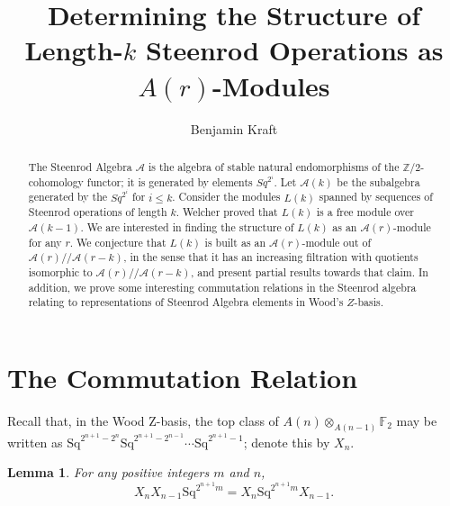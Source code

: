 \documentclass{article}
\title{Determining the Structure of Length-$k$ Steenrod Operations as $A(r)$-Modules}
\author{Benjamin Kraft}
\newcommand{\F}{\mathbb{F}}
\newcommand{\Sq}{\mathrm{Sq}}
\newtheorem{lem}{Lemma}
\begin{document}
\begin{abstract}
  The Steenrod Algebra $\mathcal{A}$ is the algebra of stable natural endomorphisms of the $\mathbb{Z}/2$-cohomology functor; it is generated by elements $Sq^{2^i}$.  Let $\mathcal{A}(k)$ be the subalgebra generated by the $Sq^{2^i}$ for $i\leq k$.  Consider the modules $L(k)$ spanned by sequences of Steenrod operations of length $k$.  Welcher proved that $L(k)$ is a free module over $\mathcal{A}(k-1)$.  We are interested in finding the structure of $L(k)$ as an $\mathcal{A}(r)$-module for any $r$.  We conjecture that $L(k)$ is built as an $\mathcal{A}(r)$-module out of $\mathcal{A}(r)/\!/\!\mathcal{A}(r-k)$, in the sense that it has an increasing filtration with quotients isomorphic to $\mathcal{A}(r)/\!/\!\mathcal{A}(r-k)$, and present partial results towards that claim.  In addition, we prove some interesting commutation relations in the Steenrod algebra relating to representations of Steenrod Algebra elements in Wood's $Z$-basis.
\end{abstract}

\section{The Commutation Relation}

  Recall that, in the Wood Z-basis, the top class of $A(n)\otimes_{A(n-1)}\F_2$ may be written as $\Sq^{2^{n+1}-2^n}\Sq^{2^{n+1}-2^{n-1}}\cdots\Sq^{2^{n+1}-1}$; denote this by $X_n$.

  \begin{lem}\label{lem:commutation-relation}
    For any positive integers $m$ and $n$,
    \[X_nX_{n-1}\Sq^{2^{n+1}m} = X_n\Sq^{2^{n+1}m}X_{n-1}.\]
  \end{lem}
\end{document}
